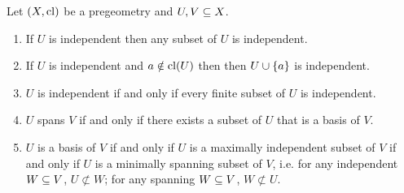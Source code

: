 \begin{prop}
    Let $(X,\operatorname{cl})$ be a pregeometry and $U,V \subseteq X$.
    \begin{enumerate}
        \item If $U$ is independent then any subset of $U$ is independent.
        \item If $U$ is independent and $a \notin \operatorname{cl}(U)$ then then 
        $U \cup \left\{a\right\}$ is independent.
        \item $U$ is independent if and only if every finite subset of $U$ is 
            independent.
        \item $U$ spans $V$ if and only if there exists a subset of 
            $U$ that is a basis of $V$. 
        \item $U$ is a basis of $V$ if and only if $U$ 
            is a maximally independent subset of $V$
            if and only if $U$ is a minimally spanning subset of $V$, 
            i.e. for any independent $W \subseteq V$, $U \not\subset W$;
            for any spanning $W \subseteq V$, $W \not\subset U$.
    \end{enumerate}
\end{prop}
